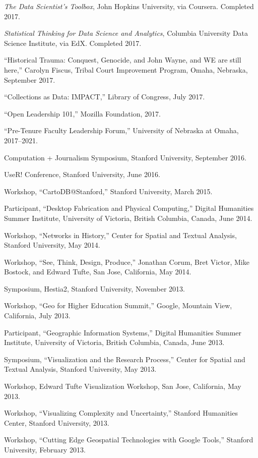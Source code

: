 \emph{The Data Scientist's Toolbox}, John Hopkins University, via
Coursera. Completed 2017.

\emph{Statistical Thinking for Data Science and Analytics}, Columbia
University Data Science Institute, via EdX. Completed 2017.

``Historical Trauma: Conquest, Genocide, and John Wayne, and WE are
still here,'' Carolyn Fiscus, Tribal Court Improvement Program, Omaha,
Nebraska, September 2017.

``Collections as Data: IMPACT,'' Library of Congress, July 2017.

``Open Leadership 101,'' Mozilla Foundation, 2017.

``Pre-Tenure Faculty Leadership Forum,'' University of Nebraska at
Omaha, 2017--2021.

Computation + Journalism Symposium, Stanford University, September 2016.

UseR! Conference, Stanford University, June 2016.

Workshop, ``CartoDB@Stanford,'' Stanford University, March 2015.

Participant, ``Desktop Fabrication and Physical Computing,'' Digital
Humanities Summer Institute, University of Victoria, British Columbia,
Canada, June 2014.

Workshop, ``Networks in History,'' Center for Spatial and Textual
Analysis, Stanford University, May 2014.

Workshop, ``See, Think, Design, Produce,'' Jonathan Corum, Bret Victor,
Mike Bostock, and Edward Tufte, San Jose, California, May 2014.

Symposium, Hestia2, Stanford University, November 2013.

Workshop, ``Geo for Higher Education Summit,'' Google, Mountain View,
California, July 2013.

Participant, ``Geographic Information Systems,'' Digital Humanities
Summer Institute, University of Victoria, British Columbia, Canada, June
2013.

Symposium, ``Visualization and the Research Process,'' Center for
Spatial and Textual Analysis, Stanford University, May 2013.

Workshop, Edward Tufte Visualization Workshop, San Jose, California, May
2013.

Workshop, ``Visualizing Complexity and Uncertainty,'' Stanford
Humanities Center, Stanford University, 2013.

Workshop, ``Cutting Edge Geospatial Technologies with Google Tools,''
Stanford University, February 2013.

